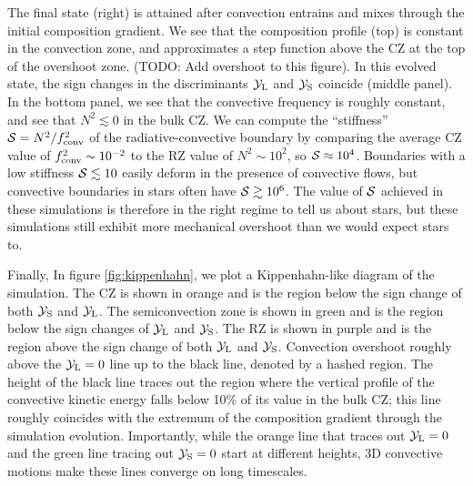 The final state (right) is attained after convection entrains and mixes through the initial composition gradient.
We see that the composition profile (top) is constant in the convection zone, and approximates a step function above the CZ at the top of the overshoot zone. (TODO: Add overshoot to this figure).
In this evolved state, the sign changes in the discriminants $\mathcal{Y}_{\rm{L}}$ and $\mathcal{Y}_{\rm{S}}$ coincide (middle panel).
In the bottom panel, we see that the convective frequency is roughly constant, and see that $N^2 \lesssim 0$ in the bulk CZ.
We can compute the ``stiffness'' $\mathcal{S} = N^2 / f_{\rm{conv}}^2$ of the radiative-convective boundary by comparing the average CZ value of $f_{\rm{conv}}^2 \sim 10^{-2}$ to the RZ value of $N^2 \sim 10^2$, so $\mathcal{S} \approx 10^4$.
Boundaries with a low stiffness $\mathcal{S} \lesssim 10$ easily deform in the presence of convective flows, but convective boundaries in stars often have $\mathcal{S} \gtrsim 10^6$.
The value of $\mathcal{S}$ achieved in these simulations is therefore in the right regime to tell us about stars, but these simulations still exhibit more mechanical overshoot than we would expect stars to.


Finally, In figure \ref{fig:kippenhahn}, we plot a Kippenhahn-like diagram of the simulation.
The CZ is shown in orange and is the region below the sign change of both $\mathcal{Y}_{\rm{S}}$ and $\mathcal{Y}_{\rm{L}}$.
The semiconvection zone is shown in green and is the region below the sign changes of $\mathcal{Y}_{\rm{L}}$ and $\mathcal{Y}_{\rm{S}}$.
The RZ is shown in purple and is the region above the sign change of both $\mathcal{Y}_{\rm{L}}$ and $\mathcal{Y}_{\rm{S}}$.
Convection overshoot roughly above the $\mathcal{Y}_{\rm{L}} = 0$ line up to the black line, denoted by a hashed region.
The height of the black line traces out the region where the vertical profile of the convective kinetic energy falls below 10\% of its value in the bulk CZ; this line roughly coincides with the extremum of the composition gradient through the simulation evolution.
Importantly, while the orange line that traces out $\mathcal{Y}_{\rm{L}} = 0$ and the green line tracing out $\mathcal{Y}_{\rm{S}} = 0$ start at different heights, 3D convective motions make these lines converge on long timescales.


